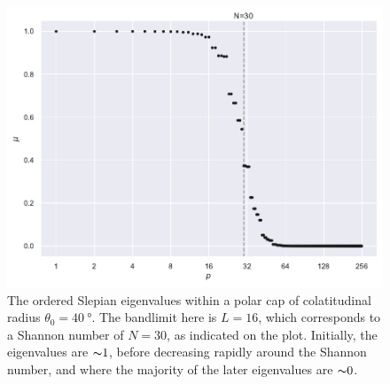\begin{figure}[htpb]
	\centering\capstart{}
	\includegraphics[width=\textwidth]{polar_cap_eigenvalues.pdf}
	\caption[
		The Slepian eigenvalues within a \(\SI{40}{\degree}\) polar cap
	]{
		The ordered Slepian eigenvalues within a polar cap of colatitudinal radius \(\theta_{0}=\SI{40}{\degree}\).
		The bandlimit here is \(L=16\), which corresponds to a Shannon number of \(N=30\), as indicated on the plot.
		Initially, the eigenvalues are \({\thicksim}\num{1}\), before decreasing rapidly around the Shannon number, and where the majority of the later eigenvalues are \({\thicksim}\num{0}\).
	}\label{fig:chapter2_polar_cap_eigenvalues}
\end{figure}
